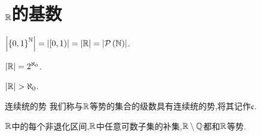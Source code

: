\section{\texorpdfstring{$\mathbb{R}$}{R}的基数}

\begin{proposition}{}{}
	$\left|\left\{0,1\right\}^{\mathbb{N}}\right|=\left|\left[0,1\right)\right|=\left|\mathbb{R}\right|=\left|\mathcal{P}\left(\mathbb{N}\right)\right|$.
\end{proposition}

\begin{theorem}{}{}
	$\left|\mathbb{R}\right|=2^{\aleph_{0}}$.
\end{theorem}

\begin{corollary}{}{}
	$\left|\R\right|>\aleph_{0}$.
\end{corollary}

\begin{definition}{连续统的势}{}
	我们称与$\mathbb{R}$等势的集合的级数具有连续统的势,将其记作$\mathfrak{c}$.
\end{definition}

\begin{proposition}{}{}
	$\mathbb{R}$中的每个非退化区间,$\mathbb{R}$中任意可数子集的补集,$\mathbb{R}\setminus\mathbb{Q}$都和$\mathbb{R}$等势.
\end{proposition}